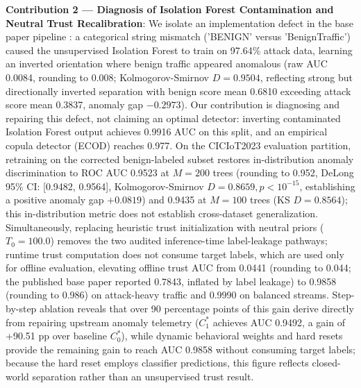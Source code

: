 \documentclass[journal,10pt,onecolumn]{IEEEtran}
\begin{document}
\textbf{Contribution 2 --- Diagnosis of Isolation Forest Contamination and Neutral Trust Recalibration}:
We isolate an implementation defect in the base paper pipeline \cite{1}: a categorical string mismatch ('BENIGN' versus 'BenignTraffic') caused the unsupervised Isolation Forest to train on 97.64\% attack data, learning an inverted orientation where benign traffic appeared anomalous (raw AUC 0.0084, rounding to 0.008; Kolmogorov-Smirnov $D = 0.9504$, reflecting strong but directionally inverted separation with benign score mean 0.6810 exceeding attack score mean 0.3837, anomaly gap $-0.2973$). Our contribution is diagnosing and repairing this defect, not claiming an optimal detector: inverting contaminated Isolation Forest output achieves 0.9916 AUC on this split, and an empirical copula detector (ECOD) reaches 0.977. On the CICIoT2023 evaluation partition, retraining on the corrected benign-labeled subset restores in-distribution anomaly discrimination to ROC AUC 0.9523 at $M=200$ trees (rounding to 0.952, DeLong 95\% CI: [0.9482, 0.9564], Kolmogorov-Smirnov $D = 0.8659, p < 10^{-15}$, establishing a positive anomaly gap $+0.0819$) and 0.9435 at $M=100$ trees (KS $D = 0.8564$); this in-distribution metric does not establish cross-dataset generalization. Simultaneously, replacing heuristic trust initialization with neutral priors ($T_0 = 100.0$) removes the two audited inference-time label-leakage pathways; runtime trust computation does not consume target labels, which are used only for offline evaluation, elevating offline trust AUC from 0.0441 (rounding to 0.044; the published base paper reported 0.7843, inflated by label leakage) to 0.9858 (rounding to 0.986) on attack-heavy traffic and 0.9990 on balanced streams. Step-by-step ablation reveals that over 90 percentage points of this gain derive directly from repairing upstream anomaly telemetry ($C_1^*$ achieves AUC 0.9492, a gain of +90.51 pp over baseline $C_0^*$), while dynamic behavioral weights and hard resets provide the remaining gain to reach AUC 0.9858 without consuming target labels; because the hard reset employs classifier predictions, this figure reflects closed-world separation rather than an unsupervised trust result.
\end{document}
